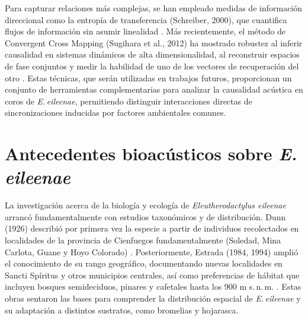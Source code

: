 Para capturar relaciones más complejas, se han empleado medidas de 
información direccional como la entropía de transferencia 
(Schreiber, 2000), que cuantifica flujos de información sin 
asumir linealidad \cite{schreiber2000measuring}. Más recientemente, el 
método de Convergent Cross Mapping (Sugihara et al., 2012) ha 
mostrado robustez al inferir causalidad en sistemas dinámicos de 
alta dimensionalidad, al reconstruir espacios de fase conjuntos 
y medir la habilidad de uno de los vectores de recuperación del 
otro \cite{sugihara2012detecting}. Estas técnicas, que serán
utilizadas en trabajos futuros, proporcionan un 
conjunto de herramientas complementarias para analizar la 
causalidad acústica en coros de \emph{E.\,eileenae}, permitiendo 
distinguir interacciones directas de sincronizaciones inducidas 
por factores ambientales comunes.

\section{Antecedentes bioacústicos sobre \emph{E.\,eileenae}}
\label{sec:antecedentes_eileenae}

La investigación acerca de la biología y ecología de 
\emph{Eleutherodactylus eileenae} arrancó fundamentalmente con 
estudios taxonómicos y de distribución. Dunn (1926) 
describió por primera vez la especie a partir de individuos 
recolectados en localidades de la provincia de Cienfuegos
fundamentalmente (Soledad, Mina Carlota, Guane y Hoyo Colorado) \cite{dunn1926additional}. 
Posteriormente, 
Estrada (1984, 1994) amplió el conocimiento de su rango 
geográfico, documentando nuevas localidades en Sancti Spíritus 
y otros municipios centrales, así como preferencias de hábitat 
que incluyen bosques semideciduos, pinares y cafetales hasta 
los 900 m s.\,n.\,m. \cite{estrada1984nuevas,estrada1994herpetofauna}. 
Estas obras sentaron las bases para comprender la distribución 
espacial de \emph{E.\,eileenae} y su adaptación a distintos 
sustratos, como bromelias y hojarasca.

